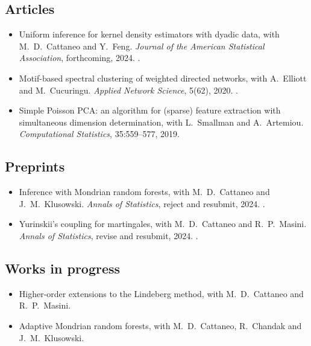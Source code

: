 \documentclass{wgu-cv}
\begin{document}
\subsection{Articles}{}
\begin{itemize}

  \item Uniform inference for kernel density estimators with dyadic data,
    with M.\ D.\ Cattaneo and Y.\ Feng.
    \emph{Journal of the American Statistical Association}, forthcoming, 2024.
    .

  \item Motif-based spectral clustering of weighted directed networks,
    with A.\ Elliott and M.\ Cucuringu.
    \emph{Applied Network Science}, 5(62), 2020.
    .

  \item Simple Poisson PCA: an algorithm for (sparse) feature extraction
    with simultaneous dimension determination,
    with L.\ Smallman and A.\ Artemiou.
    \emph{Computational Statistics}, 35:559--577, 2019.

\end{itemize}

\subsection{Preprints}{}
\begin{itemize}

  \item Inference with Mondrian random forests,
    with M.\ D.\ Cattaneo and J.\ M.\ Klusowski.
    \emph{Annals of Statistics}, reject and resubmit, 2024.
    .

  \item Yurinskii's coupling for martingales,
    with M.\ D.\ Cattaneo and R.\ P.\ Masini.
    \emph{Annals of Statistics}, revise and resubmit, 2024.
    .

\end{itemize}

\pagebreak

\subsection{Works in progress}{}
\begin{itemize}

  \item Higher-order extensions to the Lindeberg method,
    with M.\ D.\ Cattaneo and R.\ P.\ Masini.

  \item Adaptive Mondrian random forests,
    with M.\ D.\ Cattaneo, R.\ Chandak and J.\ M.\ Klusowski.
\end{itemize}
\end{document}

